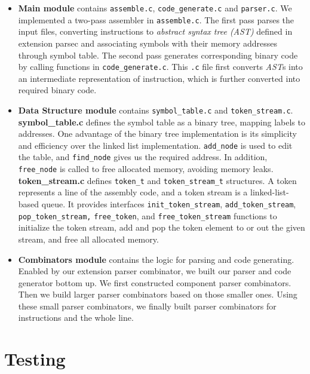 \documentclass{article}
\begin{document}
\begin{itemize}
    \item \textbf{Main module} contains \texttt{assemble.c}, \texttt{code\_generate.c} and \texttt{parser.c}. We implemented a two-pass assembler in \texttt{assemble.c}. 
    The first pass parses the input files, converting instructions to \textit{abstract syntax tree (AST)} defined in extension parsec and associating symbols with their memory addresses through symbol table. 
    The second pass generates corresponding binary code by calling functions in \texttt{code\_generate.c}. This \texttt{.c} file first converts \textit{AST}s into an intermediate representation of instruction, which is further converted into required binary code.
    \item \textbf{Data Structure module} contains \texttt{symbol\_table.c} and \texttt{token\_stream.c}.\\
    \textbf{symbol\_table.c} defines the symbol table as a binary tree, mapping labels to addresses. One advantage of the binary tree implementation is its simplicity and efficiency over the linked list implementation. \texttt{add\_node} is used to edit the table, and \texttt{find\_node} gives us the required address. In addition, \texttt{free\_node} is called to free allocated memory, avoiding memory leaks.\\
    \textbf{token\_stream.c} defines \texttt{token\_t} and \texttt{token\_stream\_t} structures. A token represents a line of the assembly code, and a token stream is a linked-list-based queue. It provides interfaces \texttt{init\_token\_stream}, \texttt{add\_token\_stream}, \texttt{pop\_token\_stream,} \texttt{free\_token}, and \texttt{free\_token\_stream} functions to initialize the token stream, add and pop the token element to or out the given stream, and free all allocated memory.
    \item \textbf{Combinators module} contains the logic for parsing and code generating.
    Enabled by our extension parser combinator, we built our parser and code generator bottom up. 
    We first constructed component parser combinators. Then we build larger parser combinators based on those smaller ones.
    Using these small parser combinators, we finally built parser combinators for instructions and the whole line.
\end{itemize}

\section{Testing}
\end{document}
